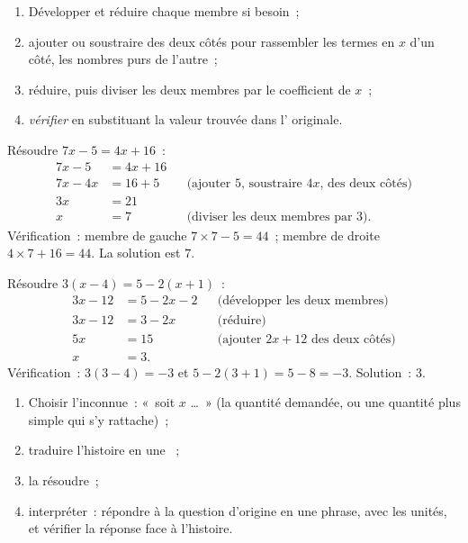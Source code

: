 \begin{method}\label{met:g8:equations:solve}
\begin{enumerate}
  \item Développer et réduire chaque membre si besoin~;
  \item ajouter ou soustraire des deux côtés pour rassembler les
        termes en $x$ d'un côté, les nombres purs de l'autre~;
  \item réduire, puis diviser les deux membres par le coefficient de
        $x$~;
  \item \emph{vérifier} en substituant la valeur trouvée dans
        l' originale.
\end{enumerate}
\end{method}

\begin{example}\label{ex:g8:equations:solve}
Résoudre $7x - 5 = 4x + 16$~:
\begin{align*}
7x - 5 &= 4x + 16 \\
7x - 4x &= 16 + 5
&& \text{(ajouter $5$, soustraire $4x$, des deux côtés)} \\
3x &= 21 \\
x &= 7 && \text{(diviser les deux membres par 3).}
\end{align*}
Vérification~: membre de gauche $7 \times 7 - 5 = 44$~; membre de
droite $4 \times 7 + 16 = 44$. La solution est $7$.
\end{example}

\begin{example}\label{ex:g8:equations:brackets}
Résoudre $3(x - 4) = 5 - 2(x + 1)$~:
\begin{align*}
3x - 12 &= 5 - 2x - 2 && \text{(développer les deux membres)} \\
3x - 12 &= 3 - 2x && \text{(réduire)} \\
5x &= 15 && \text{(ajouter $2x + 12$ des deux côtés)} \\
x &= 3 .
\end{align*}
Vérification~: $3(3 - 4) = -3$ et $5 - 2(3+1) = 5 - 8 = -3$. \quad
Solution~: $3$.
\end{example}

\begin{method}\label{met:g8:equations:problem}
\begin{enumerate}
  \item Choisir l'inconnue~: «~soit $x$ \dots~» (la quantité demandée,
        ou une quantité plus simple qui s'y rattache)~;
  \item traduire l'histoire en une ~;
  \item la résoudre~;
  \item interpréter~: répondre à la question d'origine en une phrase,
        avec les unités, et vérifier la réponse face à l'histoire.
\end{enumerate}
\end{method}

